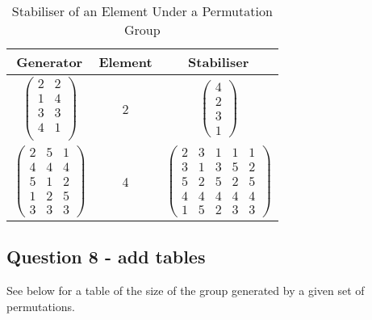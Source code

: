\documentclass{article}
\begin{document}
\begin{table}[hp]
\begin{center}
\begin{tabular}{|c|cc|}
\hline
Generator & Element & Stabiliser \\ \hline
$\begin{pmatrix}
         2  &   2\\
         1   &  4\\
         3   &  3\\
         4   &  1\\
\end{pmatrix}$    & 2      & $\begin{pmatrix}
     4   \\ 
     2   \\ 
     3    \\
     1 
\end{pmatrix} $         \\
$\begin{pmatrix}
     2  &  5  &  1\\
     4  &  4  &  4\\
     5  &  1  &  2\\
     1  &  2  &  5\\
     3  &  3  &  3
     \end{pmatrix}$      & 4      & $\begin{pmatrix}
      2  &  3 &  1  &  1  &  1  \\ 
      3  &  1 &  3  &  5  &  2  \\ 
      5  &  2 &  5  &  2  &  5   \\
      4  &  4 &  4  &  4  &  4   \\
      1  &  5 &  2  &  3  &  3 
\end{pmatrix}$        \\ \hline
\end{tabular}
\caption{Stabiliser of an Element Under a Permutation Group}
\end{center}
\end{table}


\newpage

\subsection{Question 8 - add tables}
See below for a table of the size of the group generated by a given set of permutations.
\end{document}
